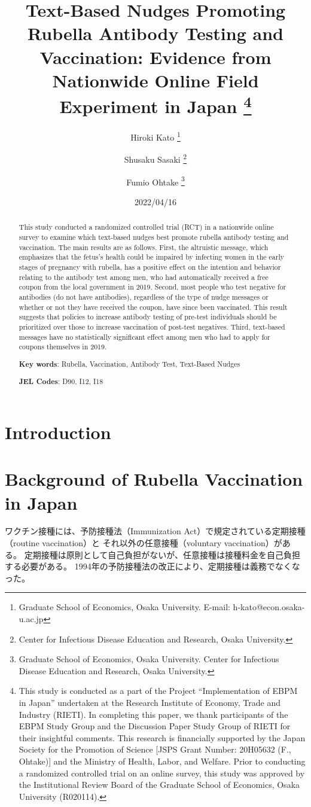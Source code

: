\documentclass[
  11pt,
  a4paper,
]{article}
\title{Text-Based Nudges Promoting Rubella Antibody Testing and Vaccination:
Evidence from Nationwide Online Field Experiment in Japan  \thanks{This study is conducted as a part of the Project ``Implementation of EBPM in Japan''
undertaken at the Research Institute of Economy, Trade and Industry (RIETI).
In completing this paper,
we thank participants of the EBPM Study Group and
the Discussion Paper Study Group of RIETI for their insightful comments.
This research is financially supported by
the Japan Society for the Promotion of Science
{[}JSPS Grant Number: 20H05632 (F., Ohtake){]}
and the Ministry of Health, Labor, and Welfare.
Prior to conducting a randomized controlled trial on an online survey,
this study was approved by the Institutional Review Board
of the Graduate School of Economics, Osaka University (R020114).}  }
\author{
    Hiroki Kato
  \thanks{Graduate School of Economics, Osaka University. E-mail: h-kato@econ.osaka-u.ac.jp  }
  \and
    Shusaku Sasaki
  \thanks{Center for Infectious Disease Education and Research, Osaka University.  }
  \and
    Fumio Ohtake
  \thanks{Graduate School of Economics, Osaka University.
Center for Infectious Disease Education and Research, Osaka University.  }
  \and
  }
\date{2022/04/16}
\begin{document}
\begin{spacing}{1}
  \maketitle
\end{spacing}
\begin{spacing}{1}
  \begin{abstract}
    This study conducted a randomized controlled trial (RCT) in a nationwide online survey
    to examine which text-based nudges best promote rubella antibody testing and vaccination.
    The main results are as follows.
    First, the altruistic message,
    which emphasizes that the fetus's health could be impaired by
    infecting women in the early stages of pregnancy with rubella,
    has a positive effect on the intention and behavior relating to the antibody test among men,
    who had automatically received a free coupon from the local government in 2019.
    Second, most people who test negative for antibodies (do not have antibodies),
    regardless of the type of nudge messages or whether or not they have received the coupon,
    have since been vaccinated.
    This result suggests that policies to increase antibody testing of pre-test individuals
    should be prioritized over those to increase vaccination of post-test negatives.
    Third, text-based messages have no statistically significant effect
    among men who had to apply for coupons themselves in 2019.
    
                \noindent
    \textbf{Key words}: Rubella, Vaccination, Antibody Test, Text-Based Nudges
        
        \noindent
    \textbf{JEL Codes}: D90, I12, I18
            
  \end{abstract}
\end{spacing}

\hypertarget{intro}{%
\section{Introduction}\label{intro}}

\hypertarget{background}{%
\section{Background of Rubella Vaccination in Japan}\label{background}}

ワクチン接種には、予防接種法（Immunization Act）で規定されている定期接種（routine vaccination）と
それ以外の任意接種（voluntary vaccination）がある。
定期接種は原則として自己負担がないが、任意接種は接種料金を自己負担する必要がある。
1994年の予防接種法の改正により、定期接種は義務でなくなった。
\end{document}
